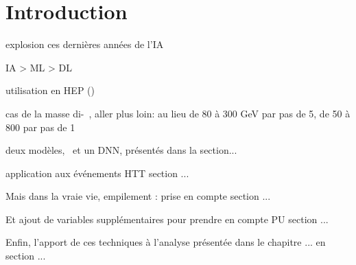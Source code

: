 \section{Introduction}\label{chapter-ML-section-intro}

explosion ces dernières années de l'IA

IA > ML > DL

utilisation en HEP (\cite{jet_flavor_deep_nn,BARTSCHI201929,Gael_thesis})

cas de la masse di-\tau~\cite{BARTSCHI201929}, aller plus loin:
au lieu de 80 à 300 GeV par pas de 5, de 50 à 800 par pas de 1

deux modèles, \XGB\ et un DNN, présentés dans la section...

application aux événements HTT section ...

Mais dans la vraie vie, empilement : prise en compte section ...

Et ajout de variables supplémentaires pour prendre en compte PU section ...

Enfin, l'apport de ces techniques à l'analyse présentée dans le chapitre ... en section ...

